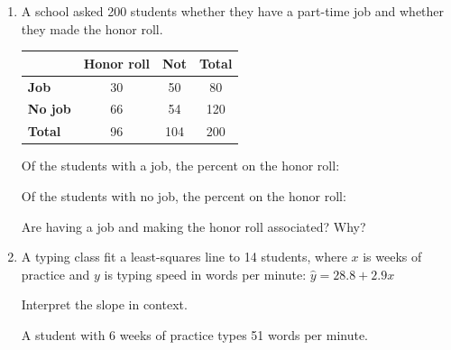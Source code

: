 \documentclass[12pt]{article}
\begin{document}

\vspace{0.12in}

\begin{enumerate}[leftmargin=1.9em, itemsep=0.2in]

  \item \begin{minipage}[t]{0.46\linewidth}\raggedright
        A school asked 200 students whether they have a part-time job and whether they made
        the honor roll.
        \end{minipage}\hfill
        \begin{minipage}[t]{0.5\linewidth}
        \centering\small
        \renewcommand{\arraystretch}{1.2}
        \begin{tabular}[t]{@{} l | c c | c @{}}
         & \textbf{Honor roll} & \textbf{Not} & \textbf{Total} \\ \hline
        \textbf{Job} & 30 & 50 & 80 \\
        \textbf{No job} & 66 & 54 & 120 \\ \hline
        \textbf{Total} & 96 & 104 & 200 \\
        \end{tabular}
        \end{minipage}

        \vspace{12pt}
        Of the students with a job, the percent on the honor roll: \blank{2.2cm}

        \vspace{12pt}
        Of the students with no job, the percent on the honor roll: \blank{2.2cm}

        \vspace{12pt}
        Are having a job and making the honor roll associated? Why?\\[16pt]
        \writeline

  \item A typing class fit a least-squares line to 14 students, where $x$ is weeks of practice
        and $y$ is typing speed in words per minute: \quad $\hat{y} = 28.8 + 2.9x$

        \vspace{12pt}
        Interpret the slope in context.\\[16pt]
        \writeline

        \vspace{12pt}
        A student with 6 weeks of practice types 51 words per minute.


\end{enumerate}
\end{document}
